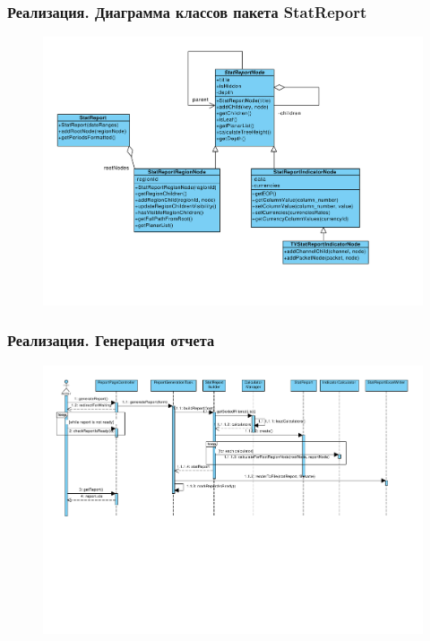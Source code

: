 \documentclass{beamer}
\begin{document}
\begin{frame}[t]
\frametitle{Реализация. Диаграмма классов пакета StatReport}
\begin{figure}
\begin{center}
\vspace{-1cm}
\hspace*{-1cm} \includegraphics[scale=0.43]{../resources/uml/StatReport.pdf}
\end{center}
\end{figure}
\end{frame}

\begin{frame}[t]
\frametitle{Реализация. Генерация отчета}
\begin{figure}
\begin{center}
\vspace{0cm}
\hspace*{-1cm} \includegraphics[scale=0.43]{../resources/uml/ReportCreation.pdf}
\end{center}
\end{figure}
\end{frame}
\end{document}
